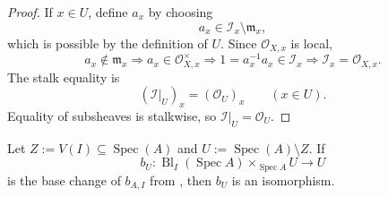 \begin{proof}
  If $x\in U$, define $a_x$ by choosing
  \[
    a_x\in\mathcal I_x\setminus\mathfrak m_x,
  \]
  which is possible by the definition of $U$.  Since
  $\mathcal O_{X,x}$ is local,
  \[
    a_x\notin\mathfrak m_x
      \Longrightarrow a_x\in\mathcal O_{X,x}^{\times}
      \Longrightarrow
      1=a_x^{-1}a_x\in\mathcal I_x
      \Longrightarrow
      \mathcal I_x=\mathcal O_{X,x}.
  \]
  The stalk equality is
  \[
    (\mathcal I|_U)_x=(\mathcal O_U)_x\qquad(x\in U).
  \]
  Equality of subsheaves is stalkwise, so
  $\mathcal I|_U=\mathcal O_U$.
\end{proof}

\begin{lemma}
  \label{lemma:nagata-affine-blowup-complement}

  Let $Z:=V(I)\subseteq\operatorname{Spec}(A)$ and
  $U:=\operatorname{Spec}(A)\setminus Z$.  If
  \[
    b_U\colon
      \operatorname{Bl}_I(\operatorname{Spec}A)\times_{\operatorname{Spec}A}U
      \longrightarrow U
  \]
  is the base change of $b_{A,I}$ from
  , then $b_U$ is an isomorphism.
\end{lemma}

